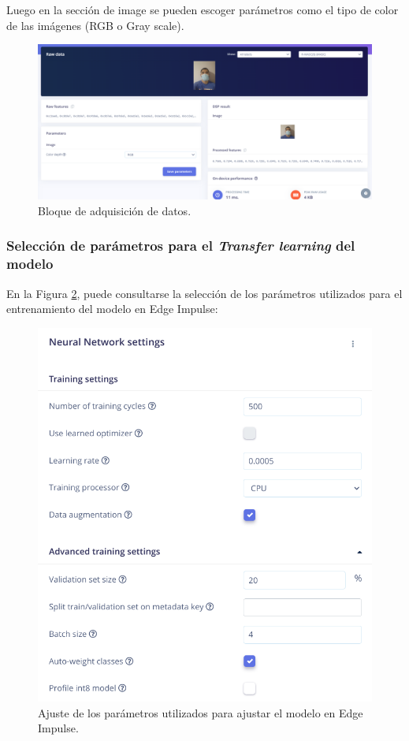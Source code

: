 Luego en la sección de image se pueden escoger parámetros como el tipo de color de las imágenes (RGB o Gray scale).
\begin{figure}[H]
\centering
\includegraphics[width=150mm]{./Figuras/Desarrollo_Analisis/prepro2}
\caption{Bloque de adquisición de datos.} 
\label{fig:prepro2}
\end{figure}
\subsubsection{Selección de parámetros para el \textit{Transfer learning} del modelo}

En la Figura \ref{fig:PNN}, puede consultarse la selección de los parámetros utilizados para el entrenamiento del modelo en Edge Impulse:

\begin{figure}[H]
\centering
\includegraphics[width=120mm]{./Figuras/Desarrollo_Analisis/PNN}
\caption{Ajuste de los parámetros utilizados para ajustar el modelo en Edge Impulse.} 
\label{fig:PNN}
\end{figure}

